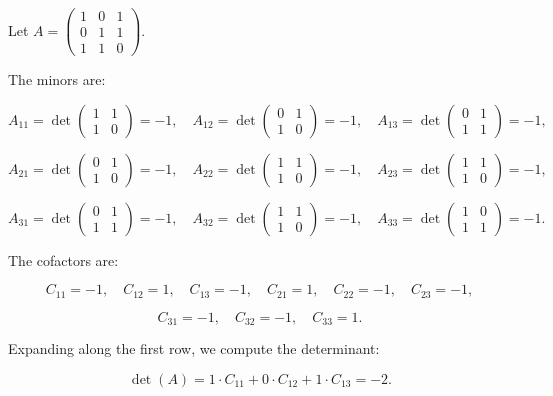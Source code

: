 \documentclass[a4paper,12pt]{article}
\begin{document}
Let \( A = \begin{pmatrix} 1 & 0 & 1 \\ 0 & 1 & 1 \\ 1 & 1 & 0 \end{pmatrix} \).

The minors are:

\[
A_{11} = \det \begin{pmatrix} 1 & 1 \\ 1 & 0 \end{pmatrix} = -1, \quad A_{12} = \det \begin{pmatrix} 0 & 1 \\ 1 & 0 \end{pmatrix} = -1, \quad A_{13} = \det \begin{pmatrix} 0 & 1 \\ 1 & 1 \end{pmatrix} = -1,
\]

\[
A_{21} = \det \begin{pmatrix} 0 & 1 \\ 1 & 0 \end{pmatrix} = -1, \quad A_{22} = \det \begin{pmatrix} 1 & 1 \\ 1 & 0 \end{pmatrix} = -1, \quad A_{23} = \det \begin{pmatrix} 1 & 1 \\ 1 & 0 \end{pmatrix} = -1,
\]

\[
A_{31} = \det \begin{pmatrix} 0 & 1 \\ 1 & 1 \end{pmatrix} = -1, \quad A_{32} = \det \begin{pmatrix} 1 & 1 \\ 1 & 0 \end{pmatrix} = -1, \quad A_{33} = \det \begin{pmatrix} 1 & 0 \\ 1 & 1 \end{pmatrix} = -1.
\]

The cofactors are:

\[
C_{11} = -1, \quad C_{12} = 1, \quad C_{13} = -1, \quad C_{21} = 1, \quad C_{22} = -1, \quad C_{23} = -1,
\]

\[
C_{31} = -1, \quad C_{32} = -1, \quad C_{33} = 1.
\]

Expanding along the first row, we compute the determinant:

\[
\det(A) = 1 \cdot C_{11} + 0 \cdot C_{12} + 1 \cdot C_{13} = -2.
\]
\end{document}
